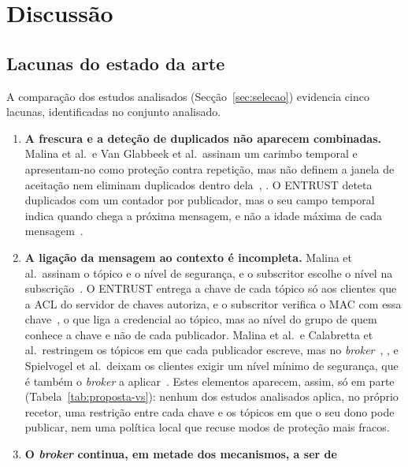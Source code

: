 \section{Discussão}
\label{sec:discussao}

\subsection{Lacunas do estado da arte}

A comparação dos \nIncluidos{} estudos analisados (Secção~\ref{sec:selecao})
evidencia cinco lacunas, identificadas no conjunto analisado.

\begin{enumerate}[label=\textbf{L\arabic*.}, leftmargin=*]
  \item \textbf{A frescura e a deteção de duplicados não aparecem combinadas.}
    Malina et al.\ e Van Glabbeek et al.\ assinam um carimbo temporal e
    apresentam-no como proteção contra repetição, mas não definem a janela de
    aceitação nem eliminam duplicados dentro dela~\cite[§5.2]{malina2019secure},
    \cite[§3.4]{vanglabbeek2022flexible}. O ENTRUST deteta duplicados com um
    contador por publicador, mas o seu campo temporal indica quando chega a
    próxima mensagem, e não a idade máxima de cada
    mensagem~\cite[§5.3, §6]{dahlmanns2021entrust}.
  \item \textbf{A ligação da mensagem ao contexto é incompleta.} Malina et al.\
    assinam o tópico e o nível de segurança, e o subscritor escolhe o nível na
    subscrição~\cite[§4.5--4.7]{malina2019secure}. O ENTRUST entrega a chave de cada
    tópico só aos clientes que a ACL do servidor de chaves autoriza, e o subscritor
    verifica o MAC com essa chave~\cite[§5.2--5.3]{dahlmanns2021entrust}, o que liga a
    credencial ao tópico, mas ao nível do grupo de quem conhece a chave e não de cada
    publicador. Malina et al.\ e Calabretta et al.\ restringem os tópicos em que cada
    publicador escreve, mas no \emph{broker}~\cite[§4.4]{malina2019secure},
    \cite[§IV-A]{calabretta2018mqttauth}, e Spielvogel et al.\ deixam os clientes
    exigir um nível mínimo de segurança, que é também o \emph{broker} a
    aplicar~\cite{spielvogel2021tls}. Estes
    elementos aparecem, assim, só em parte (Tabela~\ref{tab:proposta-vs}): nenhum dos
    estudos analisados aplica, no próprio recetor, uma restrição entre cada chave e
    os tópicos em que o seu dono pode publicar, nem uma política local que recuse
    modos de proteção mais fracos.
  \item \textbf{O \emph{broker} continua, em metade dos mecanismos, a ser de
}
\end{enumerate}
